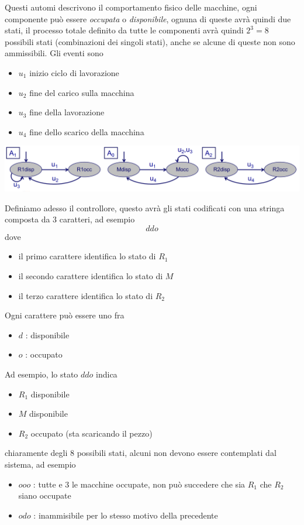 \documentclass[10pt, letterpaper]{report}
\begin{document}
Questi automi descrivono il comportamento fisico delle macchine, ogni componente può essere \textit{occupata} o \textit{disponibile}, ognuna di queste avrà quindi due stati, il processo totale definito da tutte le componenti avrà quindi $2^3=8$ possibili stati (combinazioni dei singoli stati), anche se alcune di queste non sono ammissibili. Gli eventi sono \begin{itemize}
    \item $u_1$ inizio ciclo di lavorazione
    \item $u_2$ fine del carico sulla macchina
    \item $u_3$ fine della lavorazione
    \item $u_4$ fine dello scarico della macchina
\end{itemize}
\begin{center}
    \includegraphics[width=\textwidth]{images/pressa2.png}
\end{center}
Definiamo adesso il controllore, questo avrà gli stati codificati con una stringa composta da 3 caratteri, ad esempio 
$$ ddo$$
dove \begin{itemize}
    \item il primo carattere identifica lo stato di $R_1$
    \item il secondo carattere identifica lo stato di $M$
    \item il terzo carattere identifica lo stato di $R_2$
\end{itemize} 
Ogni carattere può essere uno fra\begin{itemize}
    \item $d$ : disponibile 
    \item $o$ : occupato 
\end{itemize}
Ad esempio, lo stato $ddo$ indica\begin{itemize}
    \item $R_1$ disponibile 
    \item $M$ disponibile 
    \item $R_2$ occupato (sta scaricando il pezzo)
\end{itemize}
chiaramente degli 8 possibili stati, alcuni non devono essere contemplati dal sistema, ad esempio 
\begin{itemize}
    \item $ooo$ : tutte e 3 le macchine occupate, non può succedere che sia $R_1$ che $R_2$ siano occupate 
    \item $odo$ :  inammisibile per lo stesso motivo della precedente
\end{itemize}
\end{document}
